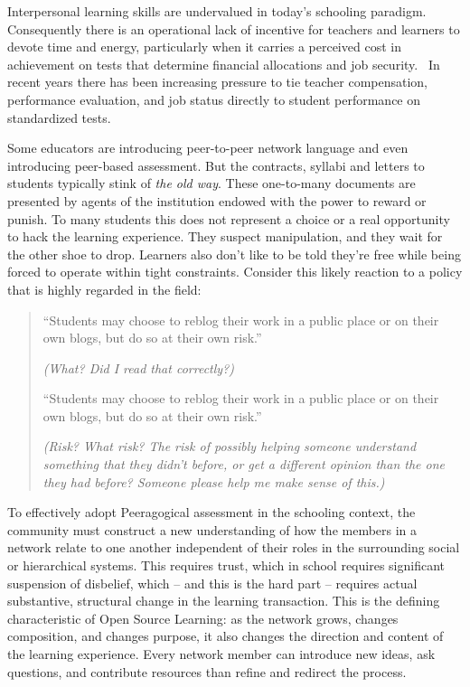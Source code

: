 Interpersonal learning skills are undervalued in today's schooling
paradigm. Consequently there is an operational lack of incentive for
teachers and learners to devote time and energy, particularly when it
carries a perceived cost in achievement on tests that determine
financial allocations and job security.~ In recent years there has been
increasing pressure to tie teacher compensation, performance evaluation,
and job status directly to student performance on standardized tests.

Some educators are introducing peer-to-peer network language and even
introducing peer-based assessment. But the contracts, syllabi and
letters to students typically stink of \emph{the old way}. These
one-to-many documents are presented by agents of the institution endowed
with the power to reward or punish. To many students this does not
represent a choice or a real opportunity to hack the learning
experience. They suspect manipulation, and they wait for the other shoe
to drop. Learners also don't like to be told they're free while being
forced to operate within tight constraints. Consider this likely
reaction to a policy that is highly regarded in the field:

\begin{quote}
``Students may choose to reblog their work in a public place or on their
own blogs, but do so at their own risk.''

\emph{(What? Did I read that correctly?)}

``Students may choose to reblog their work in a public place or on their
own blogs, but do so at their own risk.''

\emph{(Risk? What risk? The risk of possibly helping someone understand
something that they didn't before, or get a different opinion than the
one they had before? Someone please help me make sense of this.)}
\end{quote}

To effectively adopt Peeragogical assessment in the schooling context,
the community must construct a new understanding of how the members in a
network relate to one another independent of their roles in the
surrounding social or hierarchical systems. This requires trust, which
in school requires significant suspension of disbelief, which -- and
this is the hard part -- requires actual substantive, structural change
in the learning transaction. This is the defining characteristic of Open
Source Learning: as the network grows, changes composition, and changes
purpose, it also changes the direction and content of the learning
experience. Every network member can introduce new ideas, ask questions,
and contribute resources than refine and redirect the process.

